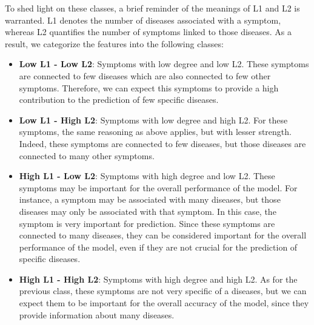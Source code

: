 To shed light on these classes, a brief reminder of the meanings of L1 and L2 is warranted. L1 denotes the number
of diseases associated with a symptom, whereas L2 quantifies the number of symptoms linked to those diseases.
As a result, we categorize the features into the following classes:\\

\begin{itemize}
    \setlength\itemsep{1em}
    \item \textbf{Low L1 - Low L2}: Symptoms with low degree and low L2. These symptoms are connected to few diseases
          which are also connected to few other symptoms. Therefore, we can expect this symptoms to provide a high
          contribution to the prediction of few specific diseases.

    \item \textbf{Low L1 - High L2}: Symptoms with low degree and high L2. For these symptoms, the same reasoning
          as above applies, but with lesser strength. Indeed, these symptoms are connected to few diseases, but those
          diseases are connected to many other symptoms.

    \item \textbf{High L1 - Low L2}: Symptoms with high degree and low L2. These symptoms may be important for the
          overall performance of the model. For instance, a symptom may be associated with many diseases, but those
          diseases may only be associated with that symptom. In this case, the symptom is very important for prediction.
          Since these symptoms are connected to many diseases, they can be considered important for the overall
          performance of the model, even if they are not crucial for the prediction of specific diseases.

    \item \textbf{High L1 - High L2}: Symptoms with high degree and high L2. As for the previous class,
          these symptoms are not very specific of a diseases, but we can expect them to be important for the overall
          accuracy of the model, since they provide information about many diseases.

\end{itemize}

